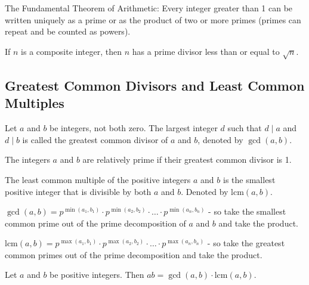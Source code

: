 \documentclass{article}
\begin{document}
\begin{theorem}
    The Fundamental Theorem of Arithmetic: Every integer greater than 1 can be written uniquely as a prime or as the product of two or more primes 
    (primes can repeat and be counted as powers).
\end{theorem}

\begin{theorem}
    If \( n \) is a composite integer, then \( n \) has a prime divisor less than or equal to \( \sqrt{n} \).
\end{theorem}

\subsection{Greatest Common Divisors and Least Common Multiples}
\begin{definition}
    Let \( a \) and \( b \) be integers, not both zero. The largest integer \( d \) such that \( d \mid a \) and \( d \mid b \) is called the greatest common divisor of \( a \) and \( b \), denoted by \( \gcd(a, b) \).
\end{definition}

\begin{definition}
    The integers \( a \) and \( b \) are relatively prime if their greatest common divisor is 1.
\end{definition}

\begin{definition}
    The least common multiple of the positive integers \( a \) and \( b \) is the smallest positive integer that is divisible by both \( a \) and \( b \). 
    Denoted by \( \text{lcm}(a, b) \).
\end{definition}

\begin{theorem}
    \( \gcd(a, b) = p^{\min(a_1, b_1)} \cdot p^{\min(a_2, b_2)} \cdot \ldots \cdot p^{\min(a_n, b_n)} \) - 
    so take the smallest common prime out of the prime decomposition of \( a \) and \( b \) and take the product.
\end{theorem}

\begin{theorem}
    \( \text{lcm}(a, b) = p^{\max(a_1, b_1)} \cdot p^{\max(a_2, b_2)} \cdot \ldots \cdot p^{\max(a_n, b_n)} \)
     - so take the greatest common primes out of the prime decomposition and take the product.
\end{theorem}

\begin{theorem}
    Let \( a \) and \( b \) be positive integers. Then \( ab = \gcd(a, b) \cdot \text{lcm}(a, b) \).
\end{theorem}
\end{document}
